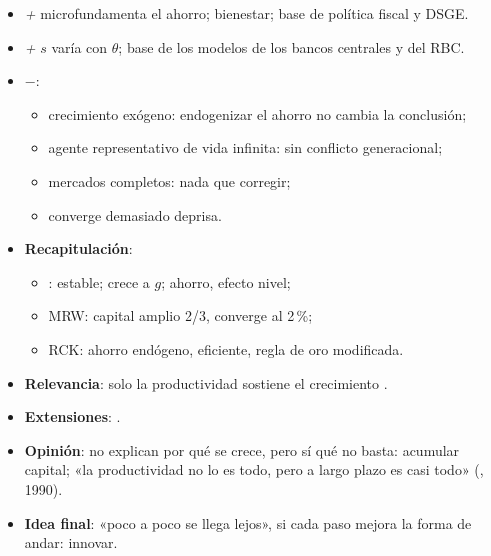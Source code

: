 \documentclass{article}
\begin{document}
\begin{columnas}
\begin{itemize}
\item \emph{+} microfundamenta el ahorro; bienestar; base de política fiscal y DSGE.
\item \emph{+} $s$ varía con $\theta$; base de los modelos de los bancos centrales y del RBC.
\item \emph{$-$}:
  \begin{itemize}
  \item crecimiento exógeno: endogenizar el ahorro no cambia la conclusión;
  \item agente representativo de vida infinita: sin conflicto generacional;
  \item mercados completos: nada que corregir;
  \item converge demasiado deprisa.
  \end{itemize}
\end{itemize}

\begin{itemize}
\item \textbf{Recapitulación}:
  \begin{itemize}
  \item {}: estable; crece a $g$; ahorro, efecto nivel;
  \item MRW: capital amplio 2/3, converge al 2\,\%;
  \item RCK: ahorro endógeno, eficiente, regla de oro modificada.
  \end{itemize}
\item \textbf{Relevancia}: solo la productividad sostiene el crecimiento .
\item \textbf{Extensiones}:    .
\item \textbf{Opinión}: no explican por qué se crece, pero sí qué no basta: acumular capital; «la productividad no lo es todo, pero a largo plazo es casi todo» (, 1990).
\item \textbf{Idea final}: «poco a poco se llega lejos», si cada paso mejora la forma de andar: innovar.
\end{itemize}


\end{columnas}
\end{document}

